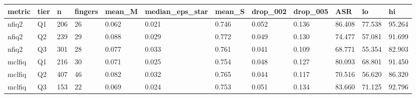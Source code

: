 \begin{tabular}{llllllllllll}
\hline
metric & tier & n & fingers & mean\_M & median\_eps\_star & mean\_S & drop\_002 & drop\_005 & ASR & lo & hi \\
\hline
nfiq2 & Q1 & 206 & 26 & 0.062 & 0.021 & 0.746 & 0.052 & 0.136 & 86.408 & 77.538 & 95.264 \\
nfiq2 & Q2 & 239 & 29 & 0.088 & 0.029 & 0.772 & 0.049 & 0.130 & 74.477 & 57.081 & 91.699 \\
nfiq2 & Q3 & 301 & 28 & 0.077 & 0.033 & 0.761 & 0.041 & 0.109 & 68.771 & 55.354 & 82.903 \\
mclfiq & Q1 & 216 & 30 & 0.071 & 0.025 & 0.754 & 0.048 & 0.127 & 80.093 & 68.801 & 91.450 \\
mclfiq & Q2 & 407 & 46 & 0.082 & 0.032 & 0.765 & 0.044 & 0.117 & 70.516 & 56.620 & 86.320 \\
mclfiq & Q3 & 153 & 22 & 0.069 & 0.024 & 0.753 & 0.051 & 0.134 & 83.660 & 71.125 & 92.796 \\
\hline
\end{tabular}
